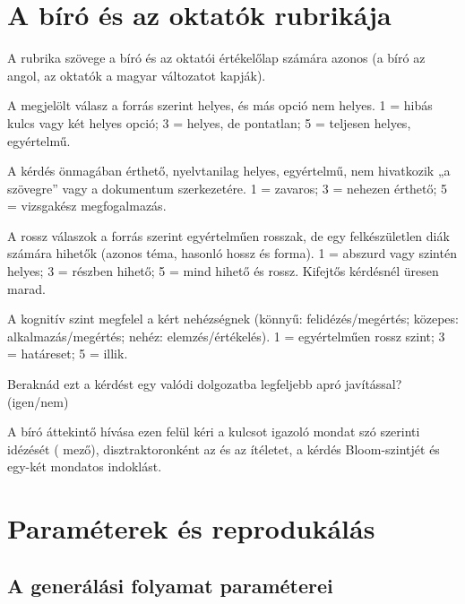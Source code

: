 \chapter{A bíró és az oktatók rubrikája}
\label{app-rubrika}

A rubrika szövege a bíró és az oktatói értékelőlap számára azonos (a bíró az angol, az oktatók a magyar
változatot kapják).

\begin{description}[style=nextline,leftmargin=0.6cm]
\item[Helyesség] A megjelölt válasz a forrás szerint helyes, és más opció nem helyes.
1 = hibás kulcs vagy két helyes opció; 3 = helyes, de pontatlan; 5 = teljesen helyes, egyértelmű.
\item[Érthetőség] A kérdés önmagában érthető, nyelvtanilag helyes, egyértelmű, nem hivatkozik „a
szövegre” vagy a dokumentum szerkezetére. 1 = zavaros; 3 = nehezen érthető; 5 = vizsgakész
megfogalmazás.
\item[Disztraktorok] A rossz válaszok a forrás szerint egyértelműen rosszak, de egy felkészületlen
diák számára hihetők (azonos téma, hasonló hossz és forma). 1 = abszurd vagy szintén helyes;
3 = részben hihető; 5 = mind hihető és rossz. Kifejtős kérdésnél üresen marad.
\item[Szintillesztés] A kognitív szint megfelel a kért nehézségnek (könnyű: felidézés/megértés;
közepes: alkalmazás/megértés; nehéz: elemzés/értékelés). 1 = egyértelműen rossz szint;
3 = határeset; 5 = illik.
\item[Felhasználnám] Beraknád ezt a kérdést egy valódi dolgozatba legfeljebb apró javítással?
(igen/nem)
\end{description}

A bíró áttekintő hívása ezen felül kéri a kulcsot igazoló mondat szó szerinti idézését
( mező), disztraktoronként az  és az  ítéletet, a
kérdés Bloom-szintjét és egy-két mondatos indoklást.

\chapter{Paraméterek és reprodukálás}
\label{app-reprodukcio}

\section{A generálási folyamat paraméterei}

